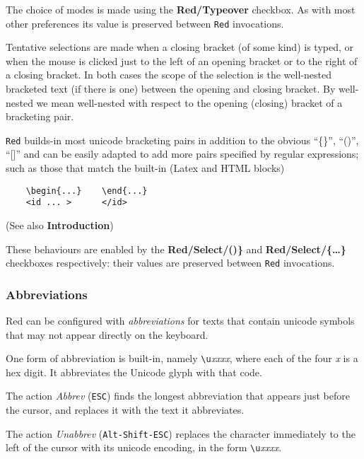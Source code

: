 \documentclass[
]{article}
\begin{document}
The choice of modes is made using the \textbf{Red/Typeover} checkbox. As
with most other preferences its value is preserved between \texttt{Red}
invocations.

Tentative selections are made when a closing bracket (of some kind) is
typed, or when the mouse is clicked just to the left of an opening
bracket or to the right of a closing bracket. In both cases the scope of
the selection is the well-nested bracketed text (if there is one)
between the opening and closing bracket. By well-nested we mean
well-nested with respect to the opening (closing) bracket of a
bracketing pair.

\texttt{Red} builds-in most unicode bracketing pairs in addition to the
obvious ``\{\}'', ``()'', ``{[}{]}'' and can be easily adapted to add
more pairs specified by regular expressions; such as those that match
the built-in (Latex and HTML blocks)

\begin{verbatim}
    \begin{...}    \end{...}
    <id ... >      </id>       
\end{verbatim}

(See also \textbf{Introduction})

These behaviours are enabled by the \textbf{Red/Select/(\ldots@)\}} and
\textbf{Red/Select/\{\ldots\}} checkboxes respectively: their values are
preserved between \texttt{Red} invocations.

\hypertarget{abbreviations}{%
\subsubsection{Abbreviations}\label{abbreviations}}

Red can be configured with \emph{abbreviations} for texts that contain
unicode symbols that may not appear directly on the keyboard.

One form of abbreviation is built-in, namely
\texttt{\textbackslash{}u}\emph{xxxx}, where each of the four \emph{x}
is a hex digit. It abbreviates the Unicode glyph with that code.

The action \emph{Abbrev} (\texttt{ESC}) finds the longest abbreviation
that appears just before the cursor, and replaces it with the text it
abbreviates.

The action \emph{Unabbrev} (\texttt{Alt-Shift-ESC}) replaces the
character immediately to the left of the cursor with its unicode
encoding, in the form \texttt{\textbackslash{}u}\emph{xxxx}.
\end{document}
